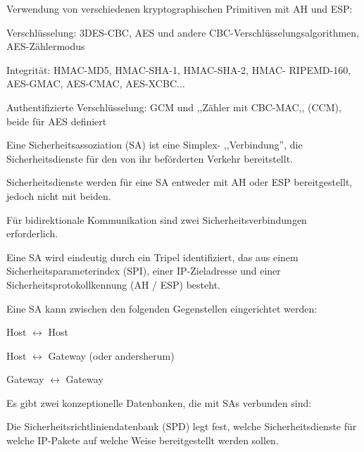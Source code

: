 \documentclass[a4paper]{article}
\begin{document}
\begin{multicols}{3}
\begin{itemize*}
            \begin{itemize*}
                  \item Verwendung von verschiedenen kryptographischen Primitiven mit AH und ESP:
                  \begin{itemize*}
                        \item Verschlüsselung: 3DES-CBC, AES und andere CBC-Verschlüsselungsalgorithmen, AES-Zählermodus
                        \item Integrität: HMAC-MD5, HMAC-SHA-1, HMAC-SHA-2, HMAC- RIPEMD-160, AES-GMAC, AES-CMAC, AES-XCBC...
                        \item Authentifizierte Verschlüsselung: GCM und ,,Zähler mit CBC-MAC,, (CCM), beide für AES definiert
                  \end{itemize*}
            \end{itemize*}
            \item Eine Sicherheitsassoziation (SA) ist eine Simplex- ,,Verbindung'', die Sicherheitsdienste für den von ihr beförderten Verkehr bereitstellt.
            \begin{itemize*}
                  \item Sicherheitsdienste werden für eine SA entweder mit AH oder ESP bereitgestellt, jedoch nicht mit beiden.
                  \item Für bidirektionale Kommunikation sind zwei Sicherheitsverbindungen erforderlich.
                  \item Eine SA wird eindeutig durch ein Tripel identifiziert, das aus einem Sicherheitsparameterindex (SPI), einer IP-Zieladresse und einer Sicherheitsprotokollkennung (AH / ESP) besteht.
                  \item Eine SA kann zwischen den folgenden Gegenstellen eingerichtet werden:
                  \begin{itemize*}
                        \item Host $\leftrightarrow$ Host
                        \item Host $\leftrightarrow$ Gateway (oder andersherum)
                        \item Gateway $\leftrightarrow$ Gateway
                  \end{itemize*}
                  \item Es gibt zwei konzeptionelle Datenbanken, die mit SAs verbunden sind:
                  \begin{itemize*}
                        \item Die Sicherheitsrichtliniendatenbank (SPD) legt fest, welche Sicherheitsdienste für welche IP-Pakete auf welche Weise bereitgestellt werden sollen.

\end{itemize*}
\end{itemize*}
\end{itemize*}
\end{multicols}
\end{document}
